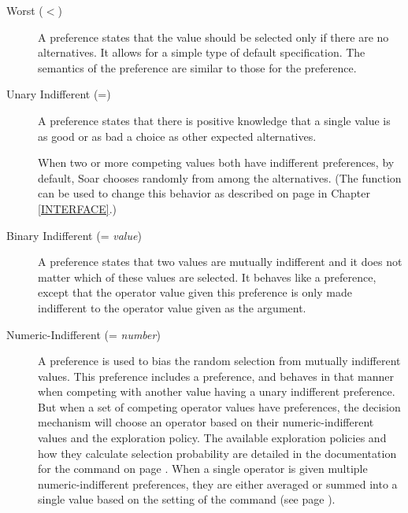 \begin{description}
\item [Worst ($<$)]
	A  preference states that the value should be selected only if there are no alternatives.  It allows for a simple type of default specification. The semantics of the  preference are similar to those for the  preference.
\vspace{-8pt}

\item [Unary Indifferent (=)]
	A  preference states that there is positive knowledge that a single value is as good or as bad a choice as other expected alternatives.

	When two or more competing values both have indifferent preferences, by default, Soar chooses randomly from among the alternatives. (The  function can be used to change this behavior as described on page \pageref{decide-indifferent-selection} in Chapter \ref{INTERFACE}.)
\vspace{-8pt}

\item [Binary Indifferent (= \emph{value})]
	A  preference states that two values are mutually indifferent and it does not matter which of these values are selected. It behaves like a  preference, except that the operator value given this preference is only made indifferent to the operator value given as the argument.
\vspace{-8pt}

\item [Numeric-Indifferent (= \emph{number})]
	A  preference is used to bias the random selection from mutually indifferent values. This preference includes a  preference, and behaves in that manner when competing with another value having a unary indifferent preference.
	But when a set of competing operator values have  preferences, the decision mechanism will choose an operator based on their numeric-indifferent values and the exploration policy. The available exploration policies and how they calculate selection probability are detailed in the documentation for the  command on page \pageref{decide-indifferent-selection}. When a single operator is given multiple numeric-indifferent preferences, they are either averaged or summed into a single value based on the setting of the  command (see page \pageref{decide-numeric-indifferent-mode}).


\end{description}
